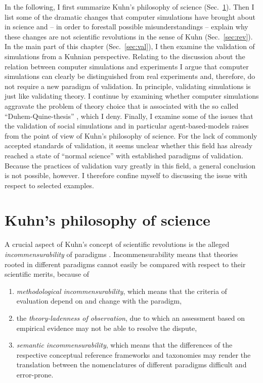 \documentclass[12pt, a4paper]{article}
\begin{document}
In the following, I first summarize Kuhn's philosophy of science
(Sec.~\ref{sec:kuhn}). Then I list some of the dramatic changes that
computer simulations have brought about in science and -- in order to
forestall possible misunderstandings -- explain why these changes are
not scientific revolutions in the sense of Kuhn (Sec.~\ref{sec:rev}).
In the main part of this chapter (Sec.~\ref{sec:val}), I then examine
the validation of simulations from a Kuhnian perspective. Relating to
the discussion about the relation between computer simulations and
experiments I argue that computer simulations can clearly be
distinguished from real experiments and, therefore, do not require a
new paradigm of validation. In principle, validating simulations is
just like validating theory. I continue by examining whether computer
simulations aggravate the problem of theory choice that is associated
with the so called ``Duhem-Quine-thesis'' \citep{harding:1976}, which
I deny. Finally, I examine some of the issues that the validation of
social simulations and in particular agent-based-models raises from
the point of view of Kuhn's philosophy of science. For the lack of
commonly accepted standards of validation, it seems unclear whether
this field has already reached a state of ``normal science'' with
established paradigms of validation. Because the practices of
validation vary greatly in this field, a general conclusion is not
possible, however. I therefore confine myself to discussing the issue
with respect to selected examples.

\section{Kuhn's philosophy of science}

\label{sec:kuhn}

A crucial aspect of Kuhn's concept of scientific revolutions is the
alleged {\em incommensurability} of paradigms \citep[ch. 12,
postscript 5.]{kuhn:1976} \citep[ch. 2]{sismondo:2007} \citep[sec.
4.3f.]{bird:2013}. Incommensurability means that theories rooted in
different paradigms cannot easily be compared with respect to their
scientific merits, because of

\begin{enumerate}

  \item {\em methodological incommensurability}, which means that the
    criteria of evaluation depend on and change with the paradigm,

  \item the {\em theory-ladenness of observation}, due to which an
    assessment based on empirical evidence may not be able to resolve
    the dispute,

  \item {\em semantic incommensurability}, which means that the
    differences of the respective conceptual reference frameworks and
    taxonomies may render the translation between the nomenclatures of
    different paradigms difficult and error-prone.

\end{enumerate}
\end{document}
